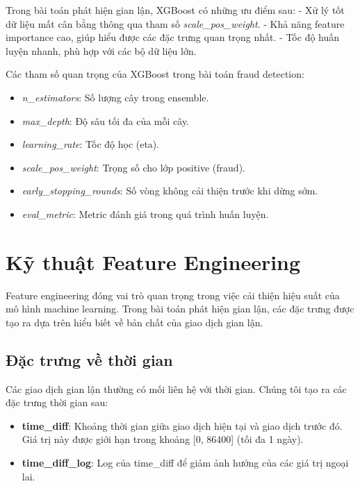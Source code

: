 Trong bài toán phát hiện gian lận, XGBoost có những ưu điểm sau:
- Xử lý tốt dữ liệu mất cân bằng thông qua tham số \textit{scale\_pos\_weight}.
- Khả năng feature importance cao, giúp hiểu được các đặc trưng quan trọng nhất.
- Tốc độ huấn luyện nhanh, phù hợp với các bộ dữ liệu lớn.

Các tham số quan trọng của XGBoost trong bài toán fraud detection:

\begin{itemize}
    \item \textit{n\_estimators}: Số lượng cây trong ensemble.
    \item \textit{max\_depth}: Độ sâu tối đa của mỗi cây.
    \item \textit{learning\_rate}: Tốc độ học (eta).
    \item \textit{scale\_pos\_weight}: Trọng số cho lớp positive (fraud).
    \item \textit{early\_stopping\_rounds}: Số vòng không cải thiện trước khi dừng sớm.
    \item \textit{eval\_metric}: Metric đánh giá trong quá trình huấn luyện.
\end{itemize}

\section{Kỹ thuật Feature Engineering}

Feature engineering đóng vai trò quan trọng trong việc cải thiện hiệu suất của mô hình machine learning. Trong bài toán phát hiện gian lận, các đặc trưng được tạo ra dựa trên hiểu biết về bản chất của giao dịch gian lận.

\subsection{Đặc trưng về thời gian}

Các giao dịch gian lận thường có mối liên hệ với thời gian. Chúng tôi tạo ra các đặc trưng thời gian sau:

\begin{itemize}
    \item \textbf{time\_diff}: Khoảng thời gian giữa giao dịch hiện tại và giao dịch trước đó. Giá trị này được giới hạn trong khoảng [0, 86400] (tối đa 1 ngày).
    
    \item \textbf{time\_diff\_log}: Log của time\_diff để giảm ảnh hưởng của các giá trị ngoại lai.
\end{itemize}

